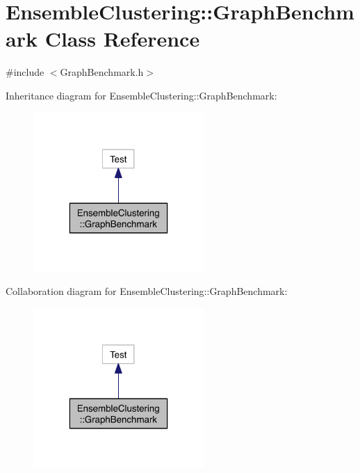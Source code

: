 \hypertarget{class_ensemble_clustering_1_1_graph_benchmark}{\section{Ensemble\-Clustering\-:\-:Graph\-Benchmark Class Reference}
\label{class_ensemble_clustering_1_1_graph_benchmark}
}


{\ttfamily \#include $<$Graph\-Benchmark.\-h$>$}



Inheritance diagram for Ensemble\-Clustering\-:\-:Graph\-Benchmark\-:
\nopagebreak
\begin{figure}[H]
\begin{center}
\leavevmode
\includegraphics[width=184pt]{class_ensemble_clustering_1_1_graph_benchmark__inherit__graph}
\end{center}
\end{figure}


Collaboration diagram for Ensemble\-Clustering\-:\-:Graph\-Benchmark\-:
\nopagebreak
\begin{figure}[H]
\begin{center}
\leavevmode
\includegraphics[width=184pt]{class_ensemble_clustering_1_1_graph_benchmark__coll__graph}
\end{center}
\end{figure}

